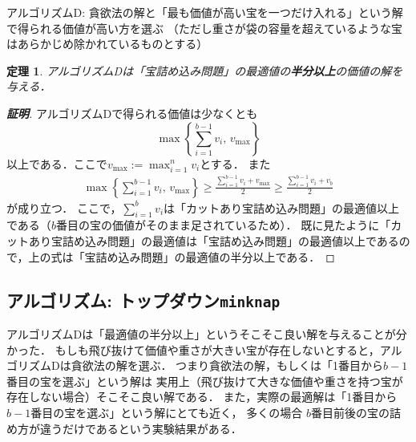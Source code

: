 \documentclass[a4paper,twoside,onecolumn,openany,article]{memoir}
\newtheorem{theorem}{定理}
\theoremstyle{remark}
\begin{document}
\vspace{1em}
\noindent
\hspace{2em} \parbox{0.9\hsize}{アルゴリズムD: 貪欲法の解と「最も価値が高い宝を一つだけ入れる」という解で得られる価値が高い方を選ぶ
（ただし重さが袋の容量を超えているような宝はあらかじめ除かれているものとする）}

\vspace{1em}

\begin{theorem}
アルゴリズム\textrm{D}は「宝詰め込み問題」の最適値の\textbf{半分以上}の価値の解を与える．
\end{theorem}
\begin{proof}[\textbf{証明}]
アルゴリズムDで得られる価値は少なくとも
\begin{equation*}
\max\left\{\sum_{i=1}^{b-1}v_i,\, v_{\max}\right\}
\end{equation*}
以上である．ここで$v_{\max}:=\max_{i=1}^n v_i$とする．
また
\begin{align*}
\max\left\{\sum_{i=1}^{b-1}v_i,\, v_{\max}\right\}
\ge
\frac{\sum_{i=1}^{b-1}v_i + v_{\max}}2
\ge
\frac{\sum_{i=1}^{b-1}v_i + v_b}2
\end{align*}
が成り立つ．
ここで，$\sum_{i=1}^b v_i$は「カットあり宝詰め込み問題」の最適値以上である（$b$番目の宝の価値がそのまま足されているため）．
既に見たように「カットあり宝詰め込み問題」の最適値は「宝詰め込み問題」の最適値以上であるので，上の式は「宝詰め込み問題」の最適値の半分以上である．
\end{proof}

\subsection{アルゴリズム: トップダウン\texttt{minknap}}
アルゴリズムDは「最適値の半分以上」というそこそこ良い解を与えることが分かった．
もしも飛び抜けて価値や重さが大きい宝が存在しないとすると，アルゴリズムDは貪欲法の解を選ぶ．
つまり貪欲法の解，もしくは「1番目から$b-1$番目の宝を選ぶ」という解は
実用上（飛び抜けて大きな価値や重さを持つ宝が存在しない場合）そこそこ良い解である．
また，実際の最適解は「1番目から$b-1$番目の宝を選ぶ」という解にとても近く，
多くの場合 $b$番目前後の宝の詰め方が違うだけであるという実験結果がある．
\end{document}
